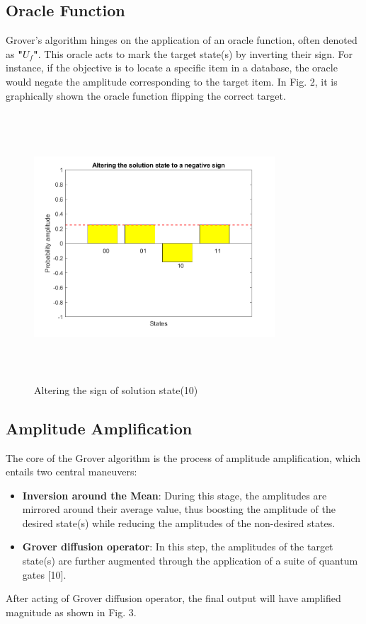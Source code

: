 \documentclass[conference]{IEEEtran}
\begin{document}
\subsection{Oracle Function}
Grover’s algorithm hinges on the application of an oracle
function, often denoted as \textbf{"$ U_f $"}. This oracle acts to mark
the target state(s) by inverting their sign. For instance, if the
objective is to locate a specific item in a database, the oracle
would negate the amplitude corresponding to the target item.
In Fig. 2, it is graphically shown the oracle function flipping
the correct target.

\begin{figure}[htbp]
	\centerline{\includegraphics[width=9cm,height=10cm,keepaspectratio]{fig2.png}}
	\caption{Altering the sign of solution state(10)}
	\label{fig}
\end{figure}

\subsection{Amplitude Amplification}
The core of the Grover algorithm is the process of amplitude
amplification, which entails two central maneuvers:
\begin{itemize}
	\item \textbf{Inversion around the Mean}: During this stage, the amplitudes are mirrored around their average value, thus  boosting the amplitude of the desired state(s) while reducing the amplitudes of the non-desired states.
	\item \textbf{Grover diffusion operator}: In this step, the amplitudes
	      of the target state(s) are further augmented through the
	      application of a suite of quantum gates [10].

\end{itemize}
After acting of Grover diffusion operator, the final output will
have amplified magnitude as shown in Fig. 3.
\end{document}
